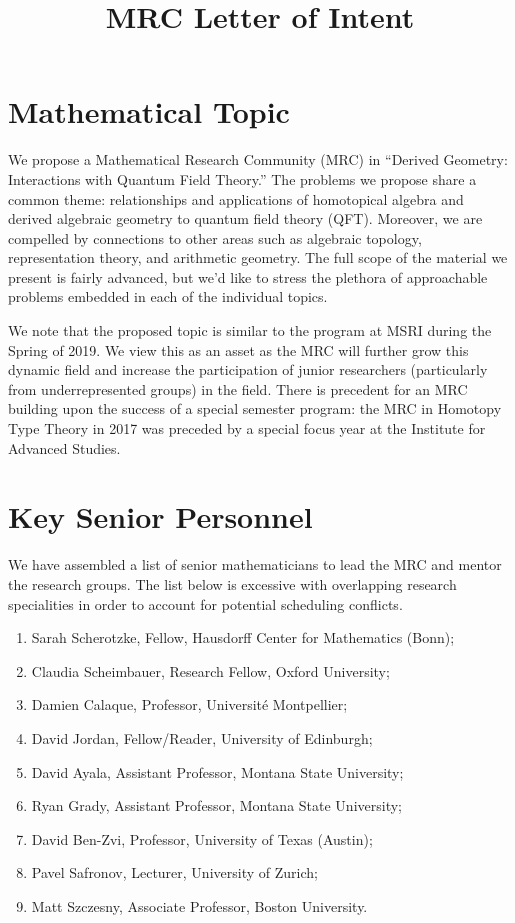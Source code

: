 \documentclass[11pt]{amsart}
\title{MRC Letter of Intent}
\begin{document}
\maketitle

\thispagestyle{empty}

\section*{Mathematical Topic}

We propose a Mathematical Research Community (MRC) in ``Derived Geometry: Interactions with Quantum Field Theory.'' 
The problems we propose share a common theme: relationships and applications of homotopical algebra and derived algebraic geometry to quantum field theory (QFT). 
Moreover, we are compelled by connections to other areas such as algebraic topology, representation theory, and arithmetic geometry. 
The full scope of the material we present is fairly advanced, but we'd like to stress the plethora of approachable problems embedded in each of the individual topics.


We note that the proposed topic is similar to the program at MSRI during the Spring of 2019. We view this as an asset as the MRC will further grow this dynamic field and increase the participation of junior researchers (particularly from underrepresented groups) in the field.  There is precedent for an MRC building upon the success of a special semester program: the MRC in Homotopy Type Theory in 2017 was preceded by a special focus year at the Institute for Advanced Studies.



\section*{Key Senior Personnel} We have assembled a list of senior mathematicians to lead the MRC and mentor the research groups.  The list below is excessive with overlapping research specialities in order to account for potential scheduling conflicts.

\begin{enumerate}
\item \label{Sarah} Sarah Scherotzke, Fellow, Hausdorff Center for Mathematics (Bonn);
\item \label{Claudia} Claudia Scheimbauer, Research Fellow, Oxford University;
\item \label{Damien} Damien Calaque, Professor, Universit\'e Montpellier;
\item \label{DavidJ} David Jordan, Fellow/Reader, University of Edinburgh;
\item \label{DavidA} David Ayala, Assistant Professor, Montana State University;
\item \label{Ryan} Ryan Grady, Assistant Professor, Montana State University;
\item \label{DavidBZ} David Ben-Zvi, Professor, University of Texas (Austin);
\item \label{PavelS} Pavel Safronov, Lecturer, University of Zurich;
\item \label{Matt} Matt Szczesny, Associate Professor, Boston University. 
\end{enumerate}
\end{document}
